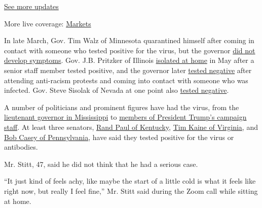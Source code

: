\href{https://www.nytimes.com/2020/08/01/world/coronavirus-covid-19.html?action=click\&pgtype=Article\&state=default\&region=MAIN_CONTENT_1\&context=storylines_live_updates}{See
more updates}

More live coverage:
\href{https://www.nytimes.com/live/2020/07/31/business/stock-market-today-coronavirus?action=click\&pgtype=Article\&state=default\&region=MAIN_CONTENT_1\&context=storylines_live_updates}{Markets}

In late March, Gov. Tim Walz of Minnesota quarantined himself after
coming in contact with someone who tested positive for the virus, but
the governor
\href{https://minnesota.cbslocal.com/2020/04/06/coronavirus-in-minnesota-gov-tim-walz-no-longer-under-self-quarantine/}{did
not develop symptoms}. Gov. J.B. Pritzker of Illinois
\href{https://www.chicagotribune.com/coronavirus/ct-coronavirus-jb-pritzker-staff-20200511-pc2b5w74jvehfp7aisew7d42rm-story.html}{isolated
at home} in May after a senior staff member tested positive, and the
governor later
\href{https://www.facebook.com/GovPritzker/posts/after-attending-recent-protests-and-coming-into-contact-with-someone-who-tested-/3183920535055618/}{tested
negative} after attending anti-racism protests and coming into contact
with someone who was infected. Gov. Steve Sisolak of Nevada at one point
also
\href{https://www.reviewjournal.com/local/local-nevada/nevada-gov-steve-sisolak-tests-negative-for-coronavirus-2037303/}{tested
negative}.

A number of politicians and prominent figures have had the virus, from
the
\href{https://www.clarionledger.com/story/news/politics/2020/07/07/mississippi-coronavirus-lt-gov-delbert-hosemann-tests-positive/5391032002/}{lieutenant
governor in Mississippi} to
\href{https://www.nytimes.com/2020/06/22/us/politics/trump-campaign-coronavirus-tulsa.html}{members
of President Trump's campaign staff}. At least three senators,
\href{https://www.nytimes.com/2020/03/22/us/politics/coronavirus-rand-paul.html}{Rand
Paul of Kentucky},
\href{https://www.kaine.senate.gov/press-releases/kaine-statement-on-coronavirus-antibody-test-results}{Tim
Kaine of Virginia}, and
\href{https://www.politico.com/news/2020/05/29/bob-casey-tests-positive-coronavirus-antibodies-288843}{Bob
Casey of Pennsylvania}, have said they tested positive for the virus or
antibodies.

Mr. Stitt, 47, said he did not think that he had a serious case.

``It just kind of feels achy, like maybe the start of a little cold is
what it feels like right now, but really I feel fine,'' Mr. Stitt said
during the Zoom call while sitting at home.

